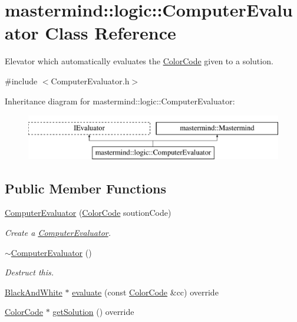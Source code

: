 \hypertarget{classmastermind_1_1logic_1_1_computer_evaluator}{}\section{mastermind\+:\+:logic\+:\+:Computer\+Evaluator Class Reference}
\label{classmastermind_1_1logic_1_1_computer_evaluator}


Elevator which automatically evaluates the \hyperlink{classmastermind_1_1logic_1_1_color_code}{Color\+Code} given to a solution.  




{\ttfamily \#include $<$Computer\+Evaluator.\+h$>$}

Inheritance diagram for mastermind\+:\+:logic\+:\+:Computer\+Evaluator\+:\begin{figure}[H]
\begin{center}
\leavevmode
\includegraphics[height=2.000000cm]{classmastermind_1_1logic_1_1_computer_evaluator}
\end{center}
\end{figure}
\subsection*{Public Member Functions}
\begin{DoxyCompactItemize}
\item 
\hyperlink{classmastermind_1_1logic_1_1_computer_evaluator_ac0f1bd2144214ce313df69491b74e328}{Computer\+Evaluator} (\hyperlink{classmastermind_1_1logic_1_1_color_code}{Color\+Code} soution\+Code)
\begin{DoxyCompactList}\small\item\em Create a \hyperlink{classmastermind_1_1logic_1_1_computer_evaluator}{Computer\+Evaluator}. \end{DoxyCompactList}\item 
\hypertarget{classmastermind_1_1logic_1_1_computer_evaluator_aa216efb1cb2e885562d01b76751c84be}{}\label{classmastermind_1_1logic_1_1_computer_evaluator_aa216efb1cb2e885562d01b76751c84be} 
\hyperlink{classmastermind_1_1logic_1_1_computer_evaluator_aa216efb1cb2e885562d01b76751c84be}{$\sim$\+Computer\+Evaluator} ()
\begin{DoxyCompactList}\small\item\em Destruct this. \end{DoxyCompactList}\item 
\hyperlink{classmastermind_1_1logic_1_1_black_and_white}{Black\+And\+White} $\ast$ \hyperlink{classmastermind_1_1logic_1_1_computer_evaluator_a579f808c46ab11077c4a3ce51838714b}{evaluate} (const \hyperlink{classmastermind_1_1logic_1_1_color_code}{Color\+Code} \&cc) override
\item 
\hyperlink{classmastermind_1_1logic_1_1_color_code}{Color\+Code} $\ast$ \hyperlink{classmastermind_1_1logic_1_1_computer_evaluator_ac6e0423a5ef2f6679cfe6be75d3a09dd}{get\+Solution} () override
\end{DoxyCompactItemize}
